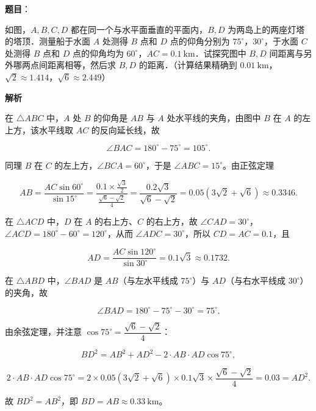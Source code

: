 \begin{answer}

\textbf{题目}：

如图，$A,B,C,D$ 都在同一个与水平面垂直的平面内，$B,D$ 为两岛上的两座灯塔的塔顶．测量船于水面 $A$ 处测得 $B$ 点和 $D$ 点的仰角分别为 $75^\circ$，$30^\circ$，于水面 $C$ 处测得 $B$ 点和 $D$ 点的仰角均为 $60^\circ$，$AC=0.1\ \mathrm{km}$．试探究图中 $B,D$ 间距离与另外哪两点间距离相等，然后求 $B,D$ 的距离．（计算结果精确到 $0.01\ \mathrm{km}$，$\sqrt2\approx1.414$，$\sqrt6\approx2.449$）
\nopagebreak[4]
\begin{center}\end{center}
\nopagebreak[4]
\textbf{解析}

在 $\triangle ABC$ 中，$A$ 处 $B$ 的仰角是 $AB$ 与 $A$ 处水平线的夹角，由图中 $B$ 在 $A$ 的左上方，该水平线取 $AC$ 的反向延长线，故

\nopagebreak[4]
\[\angle BAC=180^\circ-75^\circ=105^\circ .\]

同理 $B$ 在 $C$ 的左上方，$\angle BCA=60^\circ$，于是 $\angle ABC=15^\circ$。由正弦定理

\nopagebreak[4]
\[AB=\frac{AC\sin60^\circ}{\sin15^\circ}
=\frac{0.1\times\frac{\sqrt3}{2}}{\frac{\sqrt6-\sqrt2}{4}}
=\frac{0.2\sqrt3}{\sqrt6-\sqrt2}
=0.05(3\sqrt2+\sqrt6)\approx0.3346 .\]

在 $\triangle ACD$ 中，$D$ 在 $A$ 的右上方、$C$ 的右上方，故 $\angle CAD=30^\circ$，$\angle ACD=180^\circ-60^\circ=120^\circ$，从而 $\angle ADC=30^\circ$，所以 $CD=AC=0.1$，且

\nopagebreak[4]
\[AD=\frac{AC\sin120^\circ}{\sin30^\circ}=0.1\sqrt3\approx0.1732 .\]

在 $\triangle ABD$ 中，$\angle BAD$ 是 $AB$（与左水平线成 $75^\circ$）与 $AD$（与右水平线成 $30^\circ$）的夹角，故

\nopagebreak[4]
\[\angle BAD=180^\circ-75^\circ-30^\circ=75^\circ .\]

由余弦定理，并注意 $\cos75^\circ=\dfrac{\sqrt6-\sqrt2}{4}$：

\nopagebreak[4]
\[BD^2=AB^2+AD^2-2\cdot AB\cdot AD\cos75^\circ,\]

\nopagebreak[4]
\[2\cdot AB\cdot AD\cos75^\circ
=2\times0.05(3\sqrt2+\sqrt6)\times0.1\sqrt3\times\frac{\sqrt6-\sqrt2}{4}
=0.03=AD^2 .\]

故 $BD^2=AB^2$，即 $BD=AB\approx0.33\ \mathrm{km}$。


\end{answer}
